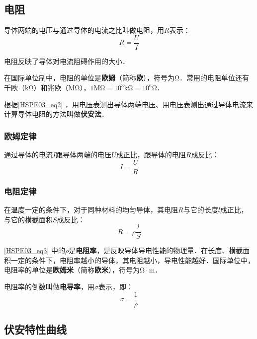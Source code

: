 \subsection{电阻}

导体两端的电压与通过导体的电流之比叫做电阻，用$R$表示：
\begin{equation}\label{HSPE03_eq2}
R=\frac{U}{I}
\end{equation}

电阻反映了导体对电流阻碍作用的大小．

在国际单位制中，电阻的单位是\textbf{欧姆}（简称\textbf{欧}），符号为$\mathrm{\Omega}$．常用的电阻单位还有千欧（$\mathrm{k\Omega}$）和兆欧（$\mathrm{M\Omega}$），$1\mathrm{M\Omega}=10^3\mathrm{k\Omega}=10^6\mathrm{\Omega}$．

根据\autoref{HSPE03_eq2} ，用电压表测出导体两端电压、用电压表测出通过导体电流来计算导体电阻的方法叫做\textbf{伏安法}．

\subsubsection{欧姆定律}

通过导体的电流$I$跟导体两端的电压$U$成正比，跟导体的电阻$R$成反比：
\begin{equation}
I=\frac{U}{R}
\end{equation}

\subsubsection{电阻定律}

在温度一定的条件下，对于同种材料的均匀导体，其电阻$R$与它的长度$l$成正比，与它的横截面积$S$成反比：
\begin{equation}\label{HSPE03_eq3}
R=\rho \frac{l}{S}
\end{equation}

\autoref{HSPE03_eq3} 中的$\rho$是\textbf{电阻率}，是反映导体导电性能的物理量．在长度、横截面积一定的条件下，电阻率越小的导体，其电阻越小，导电性能越好．国际单位中，电阻率的单位是\textbf{欧姆米}（简称\textbf{欧米}），符号为$\mathrm{\Omega\cdot m}$．

电阻率的倒数叫做\textbf{电导率}，用$\sigma$表示，即：
\begin{equation}
\sigma = \frac{1}{\rho}
\end{equation}

\subsection{伏安特性曲线}

